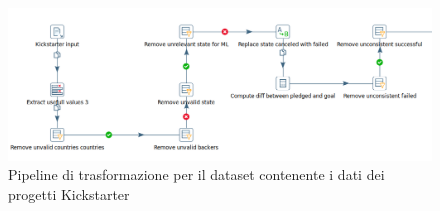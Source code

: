 \begin{figure}
	\hspace*{-1cm}%
	\includegraphics[width=\dimexpr\textwidth+2cm\relax]{images/transformation_kick}%
	\hspace*{-1cm}%
	\caption{Pipeline di trasformazione per il dataset contenente i dati dei progetti Kickstarter}
	\label{fig:transformationkick}
\end{figure}

